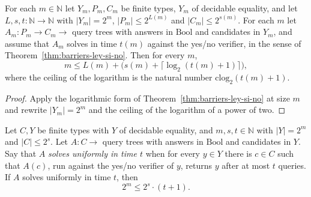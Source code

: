 \begin{theorem}
  \label{thm:barriers-precio-se-paga}
  \leanok
  For each $m \in \mathbb{N}$ let $Y_m, P_m, C_m$ be finite types, $Y_m$ of decidable equality, and
  let $L, s, t : \mathbb{N} \to \mathbb{N}$ with $|Y_m| = 2^m$, $|P_m| \le 2^{L(m)}$ and $|C_m| \le
  2^{s(m)}$. For each $m$ let $A_m : P_m \to C_m \to$ query trees with answers in $\mathrm{Bool}$ and
  candidates in $Y_m$, and assume that $A_m$ solves in time $t(m)$ against the yes/no verifier, in
  the sense of Theorem~\ref{thm:barriers-ley-si-no}. Then for every $m$,
  \[
    m \le L(m) + \bigl(s(m) + \lceil \log_2 (t(m) + 1) \rceil\bigr),
  \]
  where the ceiling of the logarithm is the natural number $\mathrm{clog}_2(t(m) + 1)$.
  \own{}
\end{theorem}

\begin{proof}
  \leanok
  Apply the logarithmic form of Theorem~\ref{thm:barriers-ley-si-no} at size $m$ and rewrite
  $|Y_m| = 2^m$ and the ceiling of the logarithm of a power of two.
\end{proof}

\begin{theorem}
  \label{thm:barriers-una-vez-no-informa}
  \leanok
  Let $C, Y$ be finite types with $Y$ of decidable equality, and $m, s, t \in \mathbb{N}$ with
  $|Y| = 2^m$ and $|C| \le 2^s$. Let $A : C \to$ query trees with answers in $\mathrm{Bool}$ and
  candidates in $Y$. Say that $A$ \emph{solves uniformly in time $t$} when for every $y \in Y$ there
  is $c \in C$ such that $A(c)$, run against the yes/no verifier of $y$, returns $y$ after at most
  $t$ queries. If $A$ solves uniformly in time $t$, then
  \[
    2^m \le 2^s \cdot (t + 1) .
  \]
  \own{}
\end{theorem}

